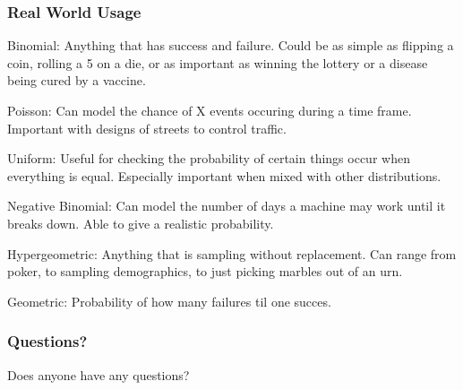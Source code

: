 \documentclass{beamer}
\begin{document}
\begin{frame}
\frametitle{Real World Usage}
Binomial: Anything that has success and failure. Could be as simple as flipping a coin, rolling a 5 on a die, or as important as winning the lottery or a disease being cured by a vaccine.

Poisson: Can model the chance of X events occuring during a time frame. Important with designs of streets to control traffic. 

Uniform: Useful for checking the probability of certain things occur when everything is equal. Especially important when mixed with other distributions.

Negative Binomial: Can model the number of days a machine may work until it breaks down. Able to give a realistic probability.

Hypergeometric: Anything that is sampling without replacement. Can range from poker, to sampling demographics, to just picking marbles out of an urn.

Geometric: Probability of how many failures til one succes.

\end{frame}

\begin{frame}
\frametitle{Questions?}
Does anyone have any questions?
\end{frame}
\end{document}
